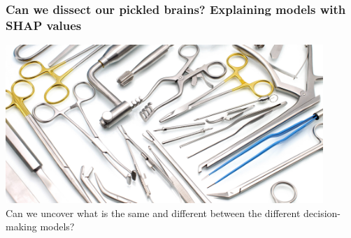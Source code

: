 \begin{frame}
\frametitle{Can we dissect our pickled brains? Explaining models with SHAP values}

\begin{center}
\includegraphics[width=0.9\textwidth]{./images/surgical_instruments}
\\
\vspace{3mm}
\small{Can we uncover what is the same and different between the different decision-making models?}
\end{center}   

\end{frame}